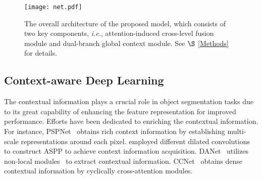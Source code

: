 \documentclass{article}
\def\ie{\emph{i.e.}}
\newcommand{\secref}[1]{$\S$ \ref{#1}}
\begin{document}
\begin{figure*}[t!]
    \centering{
    }
	\texttt{[image: net.pdf]}
	\caption{The overall architecture of the proposed model, which consists of two key components, \ie, attention-induced cross-level fusion module and dual-branch global context module. See \secref{Methods} for details.
	}
    \label{fig:net}
\end{figure*}

\subsection{Context-aware Deep Learning}
The contextual information plays a crucial role in object segmentation tasks due to its great capability of enhancing the feature representation for improved performance.
Efforts have been dedicated to enriching the contextual information.
For instance, PSPNet~\cite{pspnet} obtains rich context information by establishing multi-scale representations around each pixel. \cite{deeplab} employed different dilated convolutions to construct ASPP to achieve context information acquisition. DANet~\cite{danet} utilizes non-local modules~\cite{nonlocal} to extract contextual information. CCNet~\cite{ccnet} obtains dense contextual information by cyclically cross-attention modules.
\end{document}
